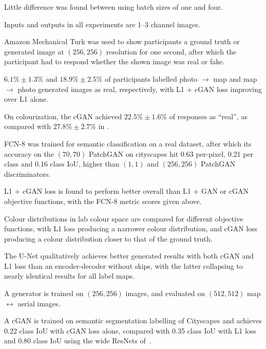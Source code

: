 \documentclass[a4paper, 12pt]{article}
\begin{document}
Little difference was found between using batch sizes of one and four.

Inputs and outputs in all experiments are 1--3 channel images.

Amazon Mechanical Turk was used to show participants a ground truth or
generated image at $(256, 256)$ resolution for one second, after which the
participant had to respond whether the shown image was real or fake.

$6.1\% \pm 1.3\%$ and $18.9\% \pm 2.5\%$ of participants labelled photo
$\rightarrow$ map and map $\rightarrow$ photo generated images as real,
respectively, with L1 + cGAN loss improving over L1 alone.

On colourization, the cGAN achieved $22.5\% \pm 1.6\%$ of responses as
``real'', as compared with $27.8\% \pm 2.7\%$ in
\cite{DBLP:journals/corr/ZhangIE16}.

FCN-8 was trained for semantic classification on a real dataset, after which
its accuracy on the $(70, 70)$ PatchGAN on cityscapes hit 0.63 per-pixel, 0.21 per
class and 0.16 class IoU, higher than $(1, 1)$ and $(256, 256)$ PatchGAN
discriminators.


L1 + cGAN loss is found to perform better overall than L1 + GAN or cGAN
objective functions, with the FCN-8 metric scores given above.

Colour distributions in lab colour space are compared for different objective
functions, with L1 loss producing a narrower colour distribution, and cGAN loss
producing a colour distribution closer to that of the ground truth.

The U-Net qualitatively achieves better generated results with both cGAN and L1
loss than an encoder-decoder without skips, with the latter collapsing to
nearly identical results for all label maps.

A generator is trained on $(256, 256)$ images, and evaluated on $(512, 512)$
map $\leftrightarrow$ aerial images.

A cGAN is trained on semantic segmentation labelling of
Cityscapes\cite{DBLP:journals/corr/CordtsORREBFRS16} and achieves 0.22 class
IoU with cGAN loss alone, compared with 0.35 class IoU with L1 loss and 0.80
class IoU using the wide ResNets of~\cite{DBLP:journals/corr/WuSH16e}.
\end{document}
